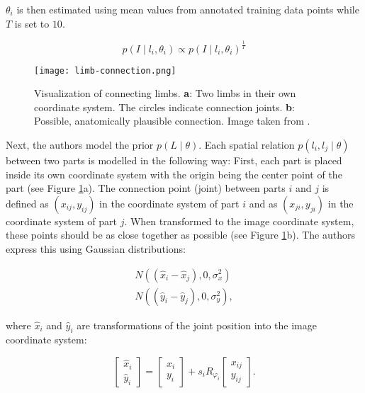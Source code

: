$\theta_i$ is then estimated using mean values from annotated training data points while $T$ is set to $10$.

\begin{equation}
    \label{eq:smoothed}
    p(I \mid l_i, \theta_i) \propto p(I \mid l_i, \theta_i)^{\frac{1}{T}}
\end{equation}

\begin{figure}[htb!]
    \centering
    \texttt{[image: limb-connection.png]}
    \caption{Visualization of connecting limbs. \textbf{a}: Two limbs in their own coordinate system. The circles indicate connection joints. \textbf{b}: Possible, anatomically plausible connection. Image taken from \cite{felzenszwalb_pictorial_2005}.}
    \label{fig:limb-connection}
\end{figure}

Next, the authors model the prior $p(L \mid \theta)$.
Each spatial relation $p(l_i, l_j \mid \theta)$ between two parts is modelled in the following way:
First, each part is placed inside its own coordinate system with the origin being the center point of the part (see Figure \ref{fig:limb-connection}a).
The connection point (joint) between parts $i$ and $j$ is defined as $(x_{ij}, y_{ij})$ in the coordinate system of part $i$ and as $(x_{ji}, y_{ji})$ in the coordinate system of part $j$.
When transformed to the image coordinate system, these points should be as close together as possible (see Figure \ref{fig:limb-connection}b).
The authors express this using Gaussian distributions:

\begin{equation}
    \begin{split}
        N((\hat{x}_i - \hat{x}_j), 0, \sigma^2_x) \\
        N((\hat{y}_i - \hat{y}_j), 0, \sigma^2_y),       
    \end{split}
\end{equation}

where $\hat{x}_i$ and $\hat{y}_i$ are transformations of the joint position into the image coordinate system:

\begin{equation}
    \begin{bmatrix}
        \hat{x}_i \\ 
        \hat{y}_i
    \end{bmatrix}
    =
    \begin{bmatrix}
        x_i \\ 
        y_i
    \end{bmatrix}
    + s_i R_{\varphi_i}
    \begin{bmatrix}
        x_{ij} \\ 
        y_{ij}
    \end{bmatrix}.
\end{equation}

